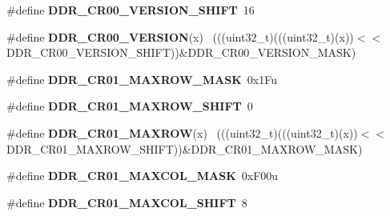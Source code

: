 \begin{DoxyCompactItemize}
\item 
\hypertarget{group___d_d_r___register___masks_gaa2e09ea415a018b5c711bee2a155844c}{}\#define {\bfseries D\+D\+R\+\_\+\+C\+R00\+\_\+\+V\+E\+R\+S\+I\+O\+N\+\_\+\+S\+H\+I\+F\+T}~16\label{group___d_d_r___register___masks_gaa2e09ea415a018b5c711bee2a155844c}

\item 
\hypertarget{group___d_d_r___register___masks_ga8358e13c0ce4a56f610b33975cf3cd9c}{}\#define {\bfseries D\+D\+R\+\_\+\+C\+R00\+\_\+\+V\+E\+R\+S\+I\+O\+N}(x)                                        ~(((uint32\+\_\+t)(((uint32\+\_\+t)(x))$<$$<$D\+D\+R\+\_\+\+C\+R00\+\_\+\+V\+E\+R\+S\+I\+O\+N\+\_\+\+S\+H\+I\+F\+T))\&D\+D\+R\+\_\+\+C\+R00\+\_\+\+V\+E\+R\+S\+I\+O\+N\+\_\+\+M\+A\+S\+K)\label{group___d_d_r___register___masks_ga8358e13c0ce4a56f610b33975cf3cd9c}

\item 
\hypertarget{group___d_d_r___register___masks_ga4de93d9bb3a3f8e4a941449cbbbb45b1}{}\#define {\bfseries D\+D\+R\+\_\+\+C\+R01\+\_\+\+M\+A\+X\+R\+O\+W\+\_\+\+M\+A\+S\+K}~0x1\+Fu\label{group___d_d_r___register___masks_ga4de93d9bb3a3f8e4a941449cbbbb45b1}

\item 
\hypertarget{group___d_d_r___register___masks_ga437c51e47bca1e8272be84305545c8e7}{}\#define {\bfseries D\+D\+R\+\_\+\+C\+R01\+\_\+\+M\+A\+X\+R\+O\+W\+\_\+\+S\+H\+I\+F\+T}~0\label{group___d_d_r___register___masks_ga437c51e47bca1e8272be84305545c8e7}

\item 
\hypertarget{group___d_d_r___register___masks_ga174893d6f450e563a044863a264530cb}{}\#define {\bfseries D\+D\+R\+\_\+\+C\+R01\+\_\+\+M\+A\+X\+R\+O\+W}(x)                                          ~(((uint32\+\_\+t)(((uint32\+\_\+t)(x))$<$$<$D\+D\+R\+\_\+\+C\+R01\+\_\+\+M\+A\+X\+R\+O\+W\+\_\+\+S\+H\+I\+F\+T))\&D\+D\+R\+\_\+\+C\+R01\+\_\+\+M\+A\+X\+R\+O\+W\+\_\+\+M\+A\+S\+K)\label{group___d_d_r___register___masks_ga174893d6f450e563a044863a264530cb}

\item 
\hypertarget{group___d_d_r___register___masks_gae1fe945e4db1a0d97bcbbdd2aa094b32}{}\#define {\bfseries D\+D\+R\+\_\+\+C\+R01\+\_\+\+M\+A\+X\+C\+O\+L\+\_\+\+M\+A\+S\+K}~0x\+F00u\label{group___d_d_r___register___masks_gae1fe945e4db1a0d97bcbbdd2aa094b32}

\item 
\hypertarget{group___d_d_r___register___masks_ga588d16fa75a2816e48af1542b591d524}{}\#define {\bfseries D\+D\+R\+\_\+\+C\+R01\+\_\+\+M\+A\+X\+C\+O\+L\+\_\+\+S\+H\+I\+F\+T}~8\label{group___d_d_r___register___masks_ga588d16fa75a2816e48af1542b591d524}


\end{DoxyCompactItemize}
